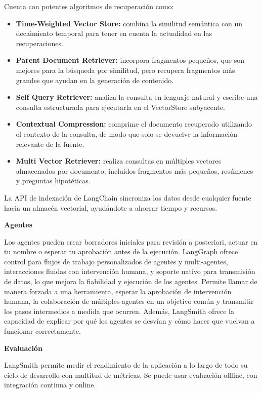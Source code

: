 Cuenta con potentes algoritmos de recuperación como:

\begin{itemize}
    \item \textbf{Time-Weighted Vector Store:} combina la similitud semántica con un decaimiento temporal para tener en cuenta la actualidad en las recuperaciones.
    \item \textbf{Parent Document Retriever:} incorpora fragmentos pequeños, que son mejores para la búsqueda por similitud, pero recupera fragmentos más grandes que ayudan en la generación de contenido.
    \item \textbf{Self Query Retriever:} analiza la consulta en lenguaje natural y escribe una consulta estructurada para ejecutarla en el VectorStore subyacente.
    \item \textbf{Contextual Compression:} comprime el documento recuperado utilizando el contexto de la consulta, de modo que solo se devuelve la información relevante de la fuente.
    \item \textbf{Multi Vector Retriever:} realiza consultas en múltiples vectores almacenados por documento, incluidos fragmentos más pequeños, resúmenes y preguntas hipotéticas.
\end{itemize}

La API de indexación de LangChain sincroniza los datos desde cualquier fuente hacia un almacén vectorial, ayudándote a ahorrar tiempo y recursos. \cite{PaginaLangChainOficialRAG} \cite{mavroudis2024langchain}

\textbf{Agentes}

Los agentes pueden crear borradores iniciales para revisión a posteriori, actuar en tu nombre o esperar tu aprobación antes de la ejecución. LangGraph ofrece control para flujos de trabajo personalizados de agentes y multi-agentes, interacciones fluidas con intervención humana, y soporte nativo para transmisión de datos, lo que mejora la fiabilidad y ejecución de los agentes. Permite llamar de manera forzada a una herramienta, esperar la aprobación de intervención humana, la colaboración de múltiples agentes en un objetivo común y transmitir los pasos intermedios a medida que ocurren. Además, LangSmith ofrece la capacidad de explicar por qué los agentes se desvían y cómo hacer que vuelvan a funcionar correctamente. \cite{PaginaLangChainOficialAgentes} \cite{mavroudis2024langchain}

\textbf{Evaluación}

LangSmith permite medir el rendimiento de la aplicación a lo largo de todo su ciclo de desarrollo con multitud de métricas. Se puede usar evaluación offline, con integración continua y online.

